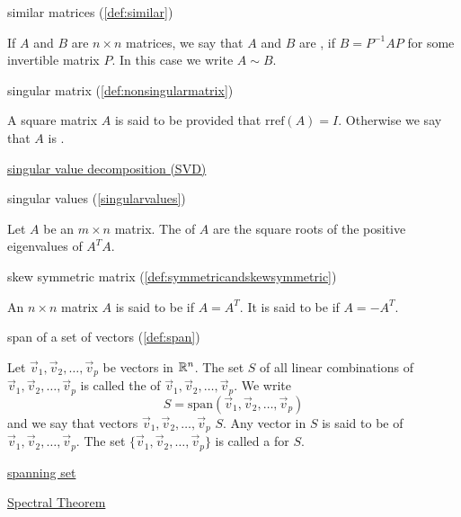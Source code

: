 \documentclass{ximera}
\begin{document}
similar matrices (\ref{def:similar})
\begin{expandable}
    If $A$ and $B$ are $n \times n$ matrices, we say that $A$ and $B$ are , if $B = P^{-1}AP$ for some invertible matrix $P$.  In this case we write $A \sim B$.
\end{expandable}

singular matrix (\ref{def:nonsingularmatrix})
\begin{expandable}
    A square matrix $A$ is said to be  provided that $\mbox{rref}(A)=I$.  Otherwise we say that $A$ is .
\end{expandable}

\href{https://ximera.osu.edu/oerlinalg/LinearAlgebra/RTH-0060/main}{singular value decomposition (SVD)}

singular values (\ref{singularvalues})
\begin{expandable}
    Let $A$ be an $m\times n$ matrix. The  of $A$ are the square roots of the positive
eigenvalues of $A^TA.$ 
\end{expandable}

skew symmetric matrix (\ref{def:symmetricandskewsymmetric})
\begin{expandable}
    An $n\times n$ matrix $A$ is said to be
 if $A=A^{T}.$ It is said to be
 if $A=-A^{T}.$
\end{expandable}


span of a set of vectors (\ref{def:span})
\begin{expandable}
    Let $\vec{v}_1, \vec{v}_2,\ldots ,\vec{v}_p$ be vectors in $\mathbb{R}^n$.  The set $S$ of all linear combinations of $\vec{v}_1, \vec{v}_2,\ldots ,\vec{v}_p$ is called the  of $\vec{v}_1, \vec{v}_2,\ldots ,\vec{v}_p$.  We write 
$$S=\mbox{span}(\vec{v}_1, \vec{v}_2,\ldots ,\vec{v}_p)$$
and we say that vectors $\vec{v}_1, \vec{v}_2,\ldots ,\vec{v}_p$  $S$.  Any vector in $S$ is said to be  of $\vec{v}_1, \vec{v}_2,\ldots ,\vec{v}_p$.  The set $\{\vec{v}_1, \vec{v}_2,\ldots ,\vec{v}_p\}$ is called a  for $S$.
\end{expandable}

\href{https://ximera.osu.edu/oerlinalg/LinearAlgebra/VEC-0090/main}{spanning set}


\href{https://ximera.osu.edu/oerlinalg/LinearAlgebra/RTH-0035/main}{Spectral Theorem}
\end{document}
